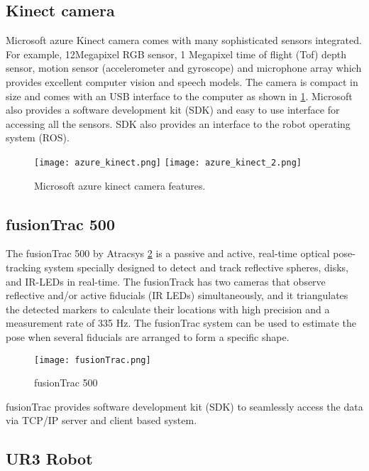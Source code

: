 \subsection{Kinect camera} Microsoft azure Kinect camera \cite{azure_kinect} comes with many sophisticated sensors integrated. For example, 12Megapixel RGB sensor, 1 Megapixel time of flight (Tof) depth sensor, motion sensor (accelerometer and gyroscope) and microphone array which provides excellent computer vision and speech models. The camera is compact in size and comes with an USB interface to the computer as shown in \cref{fig:azure_kinect}. Microsoft also provides a software development kit (SDK) and easy to use interface for accessing all the sensors. SDK also provides an interface to the robot operating system (ROS).   

\begin{figure}[hbt!]
	\centering
	\texttt{[image: azure\_kinect.png]}
	\hfill
	\texttt{[image: azure\_kinect\_2.png]}
	\caption{Microsoft azure kinect camera features.} 
	\label{fig:azure_kinect}
\end{figure}

 \subsection{fusionTrac 500} The fusionTrac 500 by Atracsys \cref{fig:fusionTrac} is a passive and active, real-time optical pose-tracking system specially designed to detect and track reflective spheres, disks, and IR-LEDs in real-time. The fusionTrack has two cameras that observe reflective and/or active fiducials (IR LEDs) simultaneously, and it triangulates the detected markers to calculate their locations with high precision and a measurement rate of 335 Hz. The fusionTrac system can be used to estimate the pose when several fiducials are arranged to form a specific shape.

\begin{figure}[hbt!]
	\centering
	\texttt{[image: fusionTrac.png]}
	\caption{fusionTrac 500 \cite{fustionTrac}} 
	\label{fig:fusionTrac}
\end{figure} 

fusionTrac provides software development kit (SDK) to seamlessly access the data via TCP/IP server and client based system. 

\subsection{UR3 Robot}

